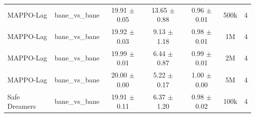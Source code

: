 \begin{longtable}{lcccccc}
MAPPO-Lag & bane\_vs\_bane & \textcolor{red!70!black}{19.91 $\pm$ 0.05} & \textcolor{green!60!black}{13.65 $\pm$ 0.88} & \textcolor{green!60!black}{0.96 $\pm$ 0.01} & 500k & 4 \\
MAPPO-Lag & bane\_vs\_bane & \textcolor{red!70!black}{19.92 $\pm$ 0.03} & \textcolor{green!60!black}{9.13 $\pm$ 1.18} & \textcolor{green!60!black}{0.98 $\pm$ 0.01} & 1M & 4 \\
MAPPO-Lag & bane\_vs\_bane & \textcolor{red!70!black}{19.99 $\pm$ 0.01} & \textcolor{green!60!black}{6.44 $\pm$ 0.87} & \textcolor{red!70!black}{0.99 $\pm$ 0.01} & 2M & 4 \\
MAPPO-Lag & bane\_vs\_bane & \textcolor{red!70!black}{20.00 $\pm$ 0.00} & \textcolor{red!70!black}{5.22 $\pm$ 0.17} & \textcolor{red!70!black}{1.00 $\pm$ 0.00} & 5M & 4 \\
Safe Dreamers & bane\_vs\_bane & 19.91 $\pm$ 0.11 & 6.37 $\pm$ 1.20 & 0.98 $\pm$ 0.02 & 100k & 4 \\
\end{longtable}
